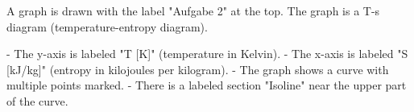 A graph is drawn with the label "Aufgabe 2" at the top. The graph is a T-s diagram (temperature-entropy diagram).  

- The y-axis is labeled "T [K]" (temperature in Kelvin).  
- The x-axis is labeled "S [kJ/kg]" (entropy in kilojoules per kilogram).  
- The graph shows a curve with multiple points marked.  
- There is a labeled section "Isoline" near the upper part of the curve.